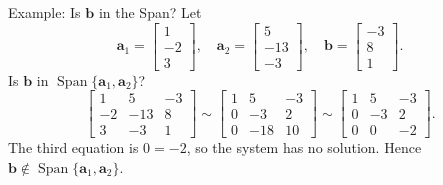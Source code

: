 \begin{frame}{Example: Is $\mathbf{b}$ in the Span?}
  Let
  \[
    \mathbf{a}_1=\begin{bmatrix}1\\-2\\3\end{bmatrix},\quad
    \mathbf{a}_2=\begin{bmatrix}5\\-13\\-3\end{bmatrix},\quad
    \mathbf{b}=\begin{bmatrix}-3\\8\\1\end{bmatrix}.
  \]
  Is $\mathbf{b}$ in $\operatorname{Span}\{\mathbf{a}_1,\mathbf{a}_2\}$?
  \[
    \left[\begin{array}{cc|c}1&5&-3\\-2&-13&8\\3&-3&1\end{array}\right]
    \sim
    \left[\begin{array}{cc|c}1&5&-3\\0&-3&2\\0&-18&10\end{array}\right]
    \sim
    \left[\begin{array}{cc|c}1&5&-3\\0&-3&2\\0&0&-2\end{array}\right].
  \]
  The third equation is $0=-2$, so the system has no solution. Hence
  $\mathbf{b}\notin\operatorname{Span}\{\mathbf{a}_1,\mathbf{a}_2\}$.
\end{frame}
